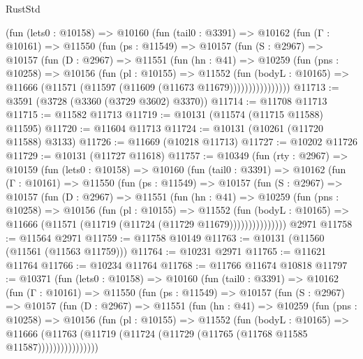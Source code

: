 \begin{lexlean}{RustStd}
\begin{coremodule}
        (fun (lets0 : @10158) =>
        @10160
          (fun (tail0 : @3391) =>
          @10162
            (fun (Γ : @10161) =>
            @11550
              (fun (ps : @11549) =>
              @10157
                (fun (S : @2967) =>
                @10157
                  (fun (D : @2967) =>
                  @11551
                    (fun (hn : @41) =>
                    @10259
                      (fun (pns : @10258) =>
                      @10156
                        (fun (pl : @10155) =>
                        @11552
                          (fun (bodyL : @10165) =>
                          @11666 (@11571 (@11597 (@11609 (@11673 @11679))))))))))))))))
@11713 := @3591 (@3728 (@3360 (@3729 @3602) @3370))
@11714 := @11708 @11713
@11715 := @11582 @11713
@11719 := @10131 (@11574 (@11715 @11588) @11595)
@11720 := @11604 @11713
@11724 := @10131 (@10261 (@11720 @11588) @3133)
@11726 := @11669 (@10218 @11713)
@11727 := @10202 @11726
@11729 := @10131 (@11727 @11618)
@11757 := @10349
    (fun (rty : @2967) =>
    @10159
      (fun (lets0 : @10158) =>
      @10160
        (fun (tail0 : @3391) =>
        @10162
          (fun (Γ : @10161) =>
          @11550
            (fun (ps : @11549) =>
            @10157
              (fun (S : @2967) =>
              @10157
                (fun (D : @2967) =>
                @11551
                  (fun (hn : @41) =>
                  @10259
                    (fun (pns : @10258) =>
                    @10156
                      (fun (pl : @10155) =>
                      @11552
                        (fun (bodyL : @10165) =>
                        @11666 (@11571 (@11719 (@11724 (@11729 @11679)))))))))))))))
    @2971
@11758 := @11564 @2971
@11759 := @11758 @10149
@11763 := @10131 (@11560 (@11561 (@11563 @11759)))
@11764 := @10231 @2971
@11765 := @11621 @11764
@11766 := @10234 @11764
@11768 := @11766 @11674 @10818
@11797 := @10371
    (fun (lets0 : @10158) =>
    @10160
      (fun (tail0 : @3391) =>
      @10162
        (fun (Γ : @10161) =>
        @11550
          (fun (ps : @11549) =>
          @10157
            (fun (S : @2967) =>
            @10157
              (fun (D : @2967) =>
              @11551
                (fun (hn : @41) =>
                @10259
                  (fun (pns : @10258) =>
                  @10156
                    (fun (pl : @10155) =>
                    @11552
                      (fun (bodyL : @10165) =>
                      @11666
                        (@11763
                          (@11719 (@11724 (@11729 (@11765 (@11768 @11585 @11587))))))))))))))))

\end{coremodule}
\end{lexlean}
